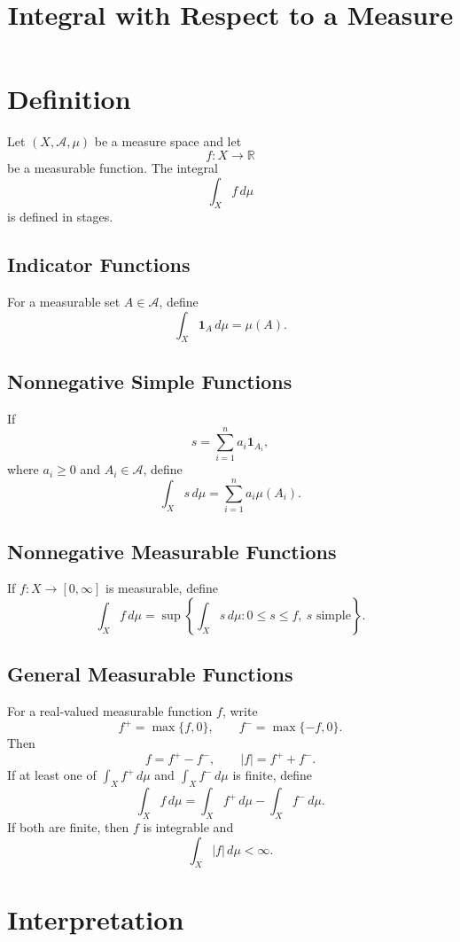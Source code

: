 \documentclass[11pt]{article}
\title{Integral with Respect to a Measure}
\author{}
\date{}
\begin{document}
\maketitle

\section*{Definition}

Let $(X,\mathcal A,\mu)$ be a measure space and let
\[
f : X \to \mathbb R
\]
be a measurable function. The integral
\[
\int_X f\,d\mu
\]
is defined in stages.

\subsection*{Indicator Functions}

For a measurable set $A \in \mathcal A$, define
\[
\int_X \mathbf 1_A\,d\mu = \mu(A).
\]

\subsection*{Nonnegative Simple Functions}

If
\[
s=\sum_{i=1}^n a_i\mathbf 1_{A_i},
\]
where $a_i\ge 0$ and $A_i\in\mathcal A$, define
\[
\int_X s\,d\mu
=
\sum_{i=1}^n a_i\mu(A_i).
\]

\subsection*{Nonnegative Measurable Functions}

If $f:X\to[0,\infty]$ is measurable, define
\[
\int_X f\,d\mu
=
\sup\left\{
\int_X s\,d\mu
:
0\le s\le f,\ s \text{ simple}
\right\}.
\]

\subsection*{General Measurable Functions}

For a real-valued measurable function $f$, write
\[
f^+=\max\{f,0\},
\qquad
f^-=\max\{-f,0\}.
\]
Then
\[
f=f^+-f^-,
\qquad
|f|=f^++f^-.
\]
If at least one of $\int_X f^+\,d\mu$ and $\int_X f^-\,d\mu$ is finite, define
\[
\int_X f\,d\mu
=
\int_X f^+\,d\mu
-
\int_X f^-\,d\mu.
\]
If both are finite, then $f$ is integrable and
\[
\int_X |f|\,d\mu<\infty.
\]

\section*{Interpretation}
\end{document}
